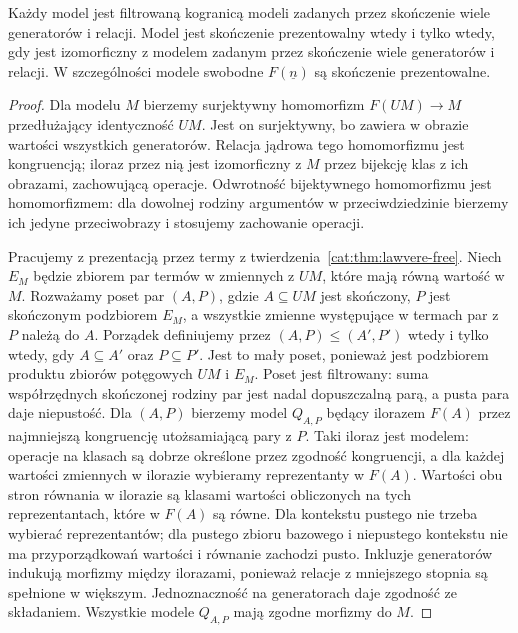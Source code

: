\begin{wniosek}\label{cat:cor:lawvere-finite-presentations}
Każdy model jest filtrowaną kogranicą modeli zadanych przez skończenie wiele generatorów i relacji. Model jest skończenie prezentowalny wtedy i tylko wtedy, gdy jest izomorficzny z modelem zadanym przez skończenie wiele generatorów i relacji. W szczególności modele swobodne $F(\underline n)$ są skończenie prezentowalne.
\end{wniosek}
\begin{proof}
Dla modelu $M$ bierzemy surjektywny homomorfizm $F(UM)\to M$ przedłużający identyczność $UM$. Jest on surjektywny, bo zawiera w obrazie wartości wszystkich generatorów. Relacja jądrowa tego homomorfizmu jest kongruencją; iloraz przez nią jest izomorficzny z $M$ przez bijekcję klas z ich obrazami, zachowującą operacje. Odwrotność bijektywnego homomorfizmu jest homomorfizmem: dla dowolnej rodziny argumentów w przeciwdziedzinie bierzemy ich jedyne przeciwobrazy i stosujemy zachowanie operacji.

Pracujemy z prezentacją przez termy z twierdzenia~\ref{cat:thm:lawvere-free}. Niech $E_M$ będzie zbiorem par termów w zmiennych z $UM$, które mają równą wartość w $M$. Rozważamy poset par $(A,P)$, gdzie $A\subseteq UM$ jest skończony, $P$ jest skończonym podzbiorem $E_M$, a wszystkie zmienne występujące w termach par z $P$ należą do $A$. Porządek definiujemy przez $(A,P)\leq(A',P')$ wtedy i tylko wtedy, gdy $A\subseteq A'$ oraz $P\subseteq P'$. Jest to mały poset, ponieważ jest podzbiorem produktu zbiorów potęgowych $UM$ i $E_M$. Poset jest filtrowany: suma współrzędnych skończonej rodziny par jest nadal dopuszczalną parą, a pusta para daje niepustość. Dla $(A,P)$ bierzemy model $Q_{A,P}$ będący ilorazem $F(A)$ przez najmniejszą kongruencję utożsamiającą pary z $P$. Taki iloraz jest modelem: operacje na klasach są dobrze określone przez zgodność kongruencji, a dla każdej wartości zmiennych w ilorazie wybieramy reprezentanty w $F(A)$. Wartości obu stron równania w ilorazie są klasami wartości obliczonych na tych reprezentantach, które w $F(A)$ są równe. Dla kontekstu pustego nie trzeba wybierać reprezentantów; dla pustego zbioru bazowego i niepustego kontekstu nie ma przyporządkowań wartości i równanie zachodzi pusto. Inkluzje generatorów indukują morfizmy między ilorazami, ponieważ relacje z mniejszego stopnia są spełnione w większym. Jednoznaczność na generatorach daje zgodność ze składaniem. Wszystkie modele $Q_{A,P}$ mają zgodne morfizmy do $M$.


\end{proof}
